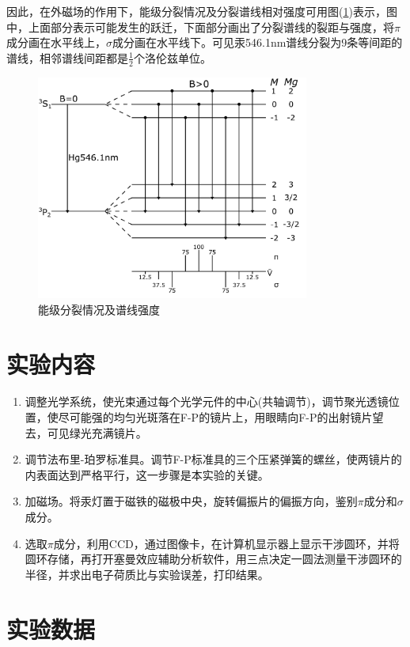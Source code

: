 \documentclass[a4paper]{article}
\begin{document}
因此，在外磁场的作用下，能级分裂情况及分裂谱线相对强度可用图(\ref{fig3})表示，图中，上面部分表示可能发生的跃迁，下面部分画出了分裂谱线的裂距与强度，将$\pi$成分画在水平线上，$\sigma$成分画在水平线下。可见汞546.1nm谱线分裂为9条等间距的谱线，相邻谱线间距都是$\frac{1}{2}$个洛伦兹单位。
\begin{figure}[!h]
\centering
\includegraphics[width=0.8\textwidth]{fig/fig3.pdf}
\caption{能级分裂情况及谱线强度}\label{fig3}
\end{figure}

\section{实验内容}
\begin{enumerate}
\item 调整光学系统，使光束通过每个光学元件的中心(共轴调节)，调节聚光透镜位置，使尽可能强的均匀光斑落在F-P的镜片上，用眼睛向F-P的出射镜片望去，可见绿光充满镜片。
\item 调节法布里-珀罗标准具。调节F-P标准具的三个压紧弹簧的螺丝，使两镜片的内表面达到严格平行，这一步骤是本实验的关键。
\item 加磁场。将汞灯置于磁铁的磁极中央，旋转偏振片的偏振方向，鉴别$\pi$成分和$\sigma$成分。
\item 选取$\pi$成分，利用CCD，通过图像卡，在计算机显示器上显示干涉圆环，并将圆环存储，再打开塞曼效应辅助分析软件，用三点决定一圆法测量干涉圆环的半径，并求出电子荷质比与实验误差，打印结果。
\end{enumerate}

\section{实验数据}
\end{document}
